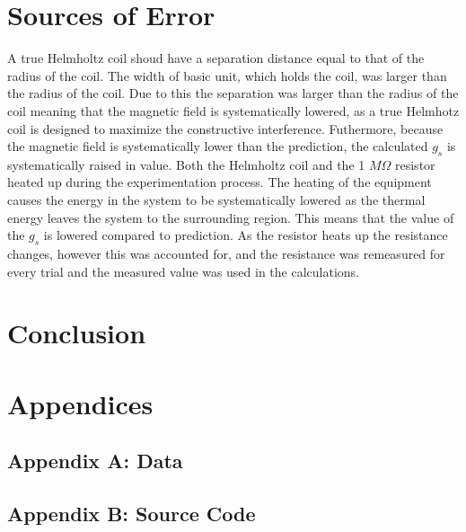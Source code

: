 \documentclass[a4paper]{article}
\begin{document}
\section{Sources of Error}
\qq A true Helmholtz coil shoud have a separation distance equal to
that of the radius of the coil. The width of basic unit, which holds
the coil, was larger than the radius of the coil. Due to this the
separation was larger than the radius of the coil meaning that the
magnetic field is systematically lowered, as a true Helmhotz coil is
designed to maximize the constructive interference.  Futhermore,
because the magnetic field is systematically lower than the
prediction, the calculated $g_s$ is systematically raised in
value. Both the Helmholtz coil and the 1 $M \Omega$ resistor heated up
during the experimentation process. The heating of the equipment
causes the energy in the system to be systematically lowered as the
thermal energy leaves the system to the surrounding region. This means
that the value of the $g_s$ is lowered compared to prediction. As the
resistor heats up the resistance changes, however this was accounted
for, and the resistance was remeasured for every trial and the
measured value was used in the calculations.

\section{Conclusion}
\qq

\section{Appendices}

\subsection{Appendix A: Data}

\subsection{Appendix B: Source Code}
\end{document}
